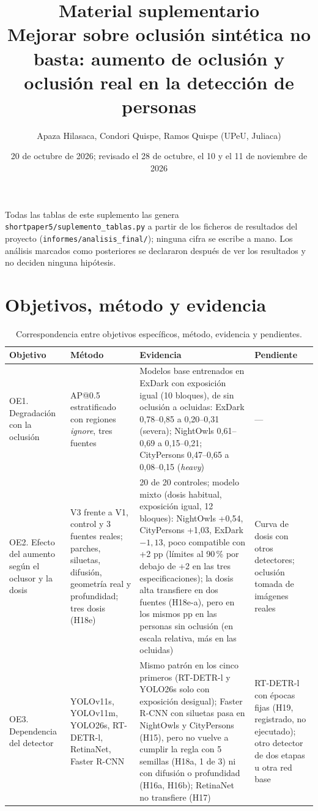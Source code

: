 \documentclass[10pt]{article}
\title{Material suplementario\\[2pt]\large Mejorar sobre oclusión sintética no basta: aumento de oclusión y oclusión real en la detección de personas}
\author{Apaza Hilasaca, Condori Quispe, Ramos Quispe (UPeU, Juliaca)}
\date{20 de octubre de 2026; revisado el 28 de octubre, el 10 y el 11 de noviembre de 2026}
\begin{document}
\maketitle
\noindent Todas las tablas de este suplemento las genera \texttt{shortpaper5/suplemento\_tablas.py} a partir de los ficheros de resultados del proyecto (\texttt{informes/analisis\_final/}); ninguna cifra se escribe a mano. Los análisis marcados como posteriores se declararon después de ver los resultados y no deciden ninguna hipótesis.

\section{Objetivos, método y evidencia}
\begin{table}[H]\centering\small
\caption{Correspondencia entre objetivos específicos, método, evidencia y pendientes.}
\begin{tabular}{@{}p{3.3cm}p{4.6cm}p{5.4cm}p{2.6cm}@{}}\toprule
\textbf{Objetivo} & \textbf{Método} & \textbf{Evidencia} & \textbf{Pendiente} \\\midrule
OE1. Degradación con la oclusión & AP@0.5 estratificado con regiones \emph{ignore}, tres fuentes & Modelos base entrenados en ExDark con exposición igual (10 bloques), de sin oclusión a ocluidas: ExDark 0,78--0,85 a 0,20--0,31 (severa); NightOwls 0,61--0,69 a 0,15--0,21; CityPersons 0,47--0,65 a 0,08--0,15 (\emph{heavy}) & --- \\
OE2. Efecto del aumento según el oclusor y la dosis & V3 frente a V1, control y 3 fuentes reales; parches, siluetas, difusión, geometría real y profundidad; tres dosis (H18e) & 20 de 20 controles; modelo mixto (dosis habitual, exposición igual, 12 bloques): NightOwls +0,54, CityPersons +1,03, ExDark $-1{,}13$, poco compatible con +2 pp (límites al 90\,\% por debajo de +2 en las tres especificaciones); la dosis alta transfiere en dos fuentes (H18e-a), pero en los mismos pp en las personas sin oclusión (en escala relativa, más en las ocluidas) & Curva de dosis con otros detectores; oclusión tomada de imágenes reales \\
OE3. Dependencia del detector & YOLOv11s, YOLOv11m, YOLO26s, RT-DETR-l, RetinaNet, Faster R-CNN & Mismo patrón en los cinco primeros (RT-DETR-l y YOLO26s solo con exposición desigual); Faster R-CNN con siluetas pasa en NightOwls y CityPersons (H15), pero no vuelve a cumplir la regla con 5 semillas (H18a, 1 de 3) ni con difusión o profundidad (H16a, H16b); RetinaNet no transfiere (H17) & RT-DETR-l con épocas fijas (H19, registrado, no ejecutado); otro detector de dos etapas u otra red base \\

\end{tabular}
\end{table}
\end{document}
